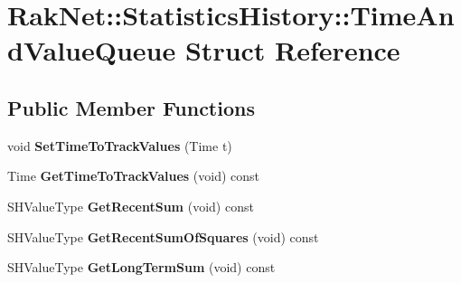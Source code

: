 \hypertarget{struct_rak_net_1_1_statistics_history_1_1_time_and_value_queue}{\section{Rak\-Net\-:\-:Statistics\-History\-:\-:Time\-And\-Value\-Queue Struct Reference}
\label{struct_rak_net_1_1_statistics_history_1_1_time_and_value_queue}
}
\subsection*{Public Member Functions}
\begin{DoxyCompactItemize}
\item 
\hypertarget{struct_rak_net_1_1_statistics_history_1_1_time_and_value_queue_a1a1c3fbbb8f62028df00f8875c02f3ca}{void {\bfseries Set\-Time\-To\-Track\-Values} (Time t)}\label{struct_rak_net_1_1_statistics_history_1_1_time_and_value_queue_a1a1c3fbbb8f62028df00f8875c02f3ca}

\item 
\hypertarget{struct_rak_net_1_1_statistics_history_1_1_time_and_value_queue_a3ec349d6422127e750f57e9954e98ac2}{Time {\bfseries Get\-Time\-To\-Track\-Values} (void) const }\label{struct_rak_net_1_1_statistics_history_1_1_time_and_value_queue_a3ec349d6422127e750f57e9954e98ac2}

\item 
\hypertarget{struct_rak_net_1_1_statistics_history_1_1_time_and_value_queue_ab338e2bdaacac2c0f9fe6fb98fe8190b}{S\-H\-Value\-Type {\bfseries Get\-Recent\-Sum} (void) const }\label{struct_rak_net_1_1_statistics_history_1_1_time_and_value_queue_ab338e2bdaacac2c0f9fe6fb98fe8190b}

\item 
\hypertarget{struct_rak_net_1_1_statistics_history_1_1_time_and_value_queue_aabfb81b6522673126dc9f0964e98666b}{S\-H\-Value\-Type {\bfseries Get\-Recent\-Sum\-Of\-Squares} (void) const }\label{struct_rak_net_1_1_statistics_history_1_1_time_and_value_queue_aabfb81b6522673126dc9f0964e98666b}

\item 
\hypertarget{struct_rak_net_1_1_statistics_history_1_1_time_and_value_queue_a298f519b8c884e08683683e099bd77f1}{S\-H\-Value\-Type {\bfseries Get\-Long\-Term\-Sum} (void) const }\label{struct_rak_net_1_1_statistics_history_1_1_time_and_value_queue_a298f519b8c884e08683683e099bd77f1}


\end{DoxyCompactItemize}
